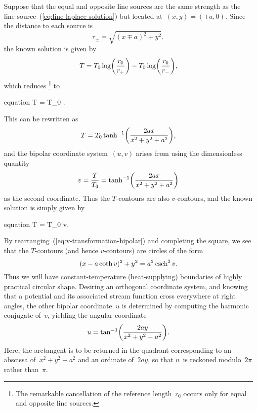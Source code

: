 Suppose that the equal and opposite line sources
are the same strength as the line source~(\ref{eq:line-laplace-solution})
but located at~$(x, y) = (\pm a, 0)$.
Since the distance to each source is
\begin{equation}
  r_\pm = \sqrt{(x \mp a)^2 + y^2},
  \label{eq:bipolar-source-distances}
\end{equation}
the known solution is given by
\begin{equation}
  T =
    T_0 \log \roundbr*{\frac{r_0}{r_+}}
      -
    T_0 \log \roundbr*{\frac{r_0}{r_-}},
  \label{eq:bipolar-laplace-solution-terms}
\end{equation}
which reduces%
\footnote{
  The remarkable cancellation of the reference length~$r_0$
  occurs only for equal and opposite line sources.
}
to
\begin{important}{equation}
  T = T_0 \log {}.
  \label{eq:bipolar-laplace-solution-source-distances}
\end{important}
This can be rewritten as
\begin{equation}
  T = T_0 \tanh^{-1} \roundbr*{\frac{2 a x}{x^2 + y^2 + a^2}},
  \label{eq:bipolar-laplace-solution-inverse-tanh}
\end{equation}
and the bipolar coordinate system~$(u, v)$ arises
from using the dimensionless quantity
\begin{equation}
  v
    = \frac{T}{T_0}
    = \tanh^{-1} \roundbr*{\frac{2 a x}{x^2 + y^2 + a^2}}
  \label{eq:v-transformation-bipolar}
\end{equation}
as the second coordinate.
Thus the $T$-contours are also $v$-contours,
and the known solution is simply given by
\begin{important}{equation}
  T = T_0 \cdot v.
  \label{eq:bipolar-laplace-solution}
\end{important}
By rearranging~(\ref{eq:v-transformation-bipolar}) and completing the square,
we see that the $T$-contours (and hence $v$-contours) are circles of the form
\begin{equation}
  (x - a \coth v)^2 + y^2 = a^2 \operatorname{csch}^2 v.
  \label{eq:bipolar-circle-v}
\end{equation}
Thus we will have constant-temperature (heat-supplying) boundaries
of highly practical circular shape.
Desiring an orthogonal coordinate system,
and knowing that a potential and its associated stream function
cross everywhere at right angles,
the other bipolar coordinate~$u$ is determined by computing
the harmonic conjugate of~$v$,
yielding the angular coordinate
\begin{equation}
  u = \tan^{-1} \roundbr*{\frac{2 a y}{x^2 + y^2 - a^2}}.
  \label{eq:u-transformation-bipolar}
\end{equation}
Here, the arctangent is to be returned in the quadrant corresponding to
an abscissa of~$x^2 + y^2 - a^2$ and an ordinate of~$2 a y$,
so that $u$~is reckoned modulo~$2 \pi$ rather than~$\pi$.

